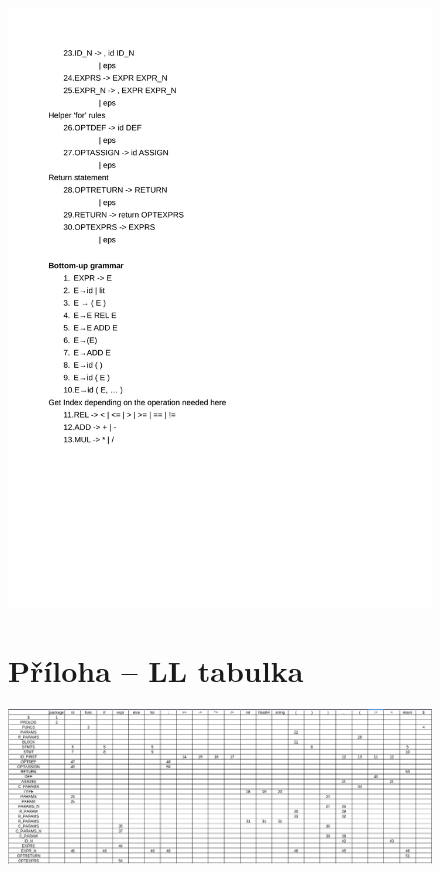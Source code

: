\documentclass[12pt]{article}
\begin{document}
    \begin{figure}
    \begin{center}
     \includegraphics[scale=0.24]{grammar-2.png}
     \end{center}
     \end{figure}
    \newpage
    \begin{figure}
    \section{Příloha -- LL tabulka}
        \begin{center}
            \includegraphics[scale=0.36]{unknown.png}
            \label{LLt}
        \end{center}
    \end{figure}
\end{document}
